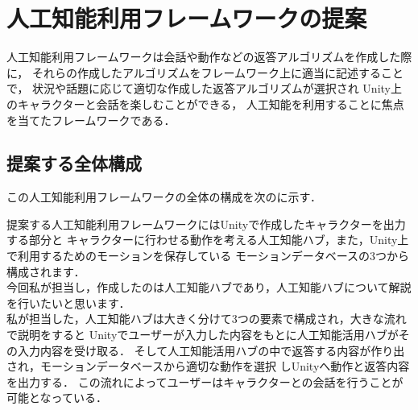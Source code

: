 \section{人工知能利用フレームワークの提案}
人工知能利用フレームワークは会話や動作などの返答アルゴリズムを作成した際に，
それらの作成したアルゴリズムをフレームワーク上に適当に記述することで，
状況や話題に応じて適切な作成した返答アルゴリズムが選択され
Unity上のキャラクターと会話を楽しむことができる，
人工知能を利用することに焦点を当てたフレームワークである．
\subsection{提案する全体構成}\label{sec:allAr}
この人工知能利用フレームワークの全体の構成を次のに示す．


提案する人工知能利用フレームワークにはUnityで作成したキャラクターを出力する部分と
キャラクターに行わせる動作を考える人工知能ハブ，また，Unity上で利用するためのモーションを保存している
モーションデータベースの3つから構成されます．\\
今回私が担当し，作成したのは人工知能ハブであり，人工知能ハブについて解説を行いたいと思います．\\

私が担当した，人工知能ハブは大きく分けて3つの要素で構成され，大きな流れで説明をすると
Unityでユーザーが入力した内容をもとに人工知能活用ハブがその入力内容を受け取る．
そして人工知能活用ハブの中で返答する内容が作り出され，モーションデータベースから適切な動作を選択
しUnityへ動作と返答内容を出力する．
この流れによってユーザーはキャラクターとの会話を行うことが可能となっている．

